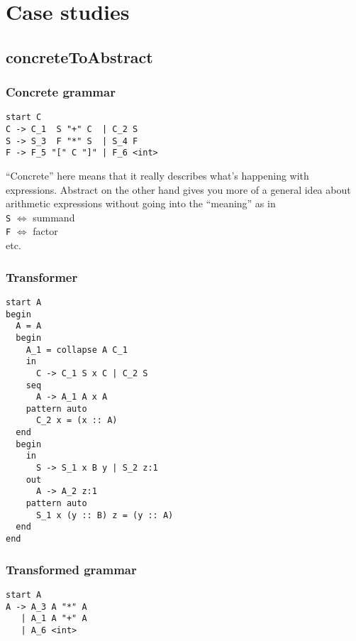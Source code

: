 \documentclass[a4paper]{article}
\begin{document}
\section*{Case studies}
\subsection*{concreteToAbstract}
\subsubsection*{Concrete grammar}
\begin{verbatim}
start C
C -> C_1  S "+" C  | C_2 S
S -> S_3  F "*" S  | S_4 F
F -> F_5 "[" C "]" | F_6 <int>
\end{verbatim}
``Concrete'' here means that it really describes what's happening with expressions. Abstract on the other hand gives you more of a general idea about arithmetic expressions without going into the ``meaning'' as in \\\verb|S| $\iff$ summand\\\verb|F| $\iff$ factor\\ etc.
\subsubsection*{Transformer}
\begin{verbatim}
start A
begin
  A = A
  begin
    A_1 = collapse A C_1 
    in
      C -> C_1 S x C | C_2 S
    seq
      A -> A_1 A x A
    pattern auto
      C_2 x = (x :: A)
  end
  begin
    in
      S -> S_1 x B y | S_2 z:1
    out
      A -> A_2 z:1
    pattern auto
      S_1 x (y :: B) z = (y :: A)
  end  
end
\end{verbatim}
\subsubsection*{Transformed grammar}
\begin{verbatim}
start A
A -> A_3 A "*" A
   | A_1 A "+" A
   | A_6 <int>
\end{verbatim}
\end{document}
